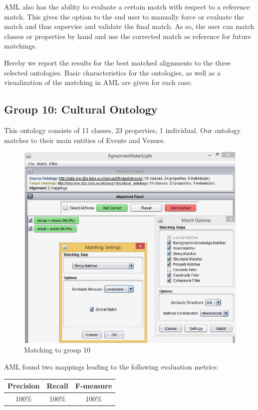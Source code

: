 \documentclass[runningheads,a4paper]{../../StyleFiles/llncs}
\begin{document}
AML also has the ability to evaluate a certain match with respect to a reference match. This gives the option to the end user to manually force or evaluate the match and thus supervise and validate the final match. As so, the user can match classes or properties by hand and use the corrected match as reference for future matchings.

Hereby we report the results for the best matched alignments to the three selected ontologies. Basic characteristics for the ontologies, as well as a visualization of the matching in AML are given for each case.

\subsection{Group 10: Cultural Ontology}
This ontology consists of 11 classes, 23 properties, 1 individual. Our ontology matches to their main entities of Events and Venues.

\begin{figure}[h]\centering
	\includegraphics[width=.7\textwidth]{img/match_g10.png}
	\caption{Matching to group 10}
	\label{fig:match_g10}
\end{figure}

AML found two mappings leading to the following evaluation metrics:

\begin{center}
	\begin{tabular}{| c | c | c |}
		\hline
		\textbf{Precision} & \textbf{Recall} & \textbf{F-measure} \\ \hline
		100\% & 100\% & 100\% \\ \hline
	\end{tabular}
\end{center}
\end{document}
